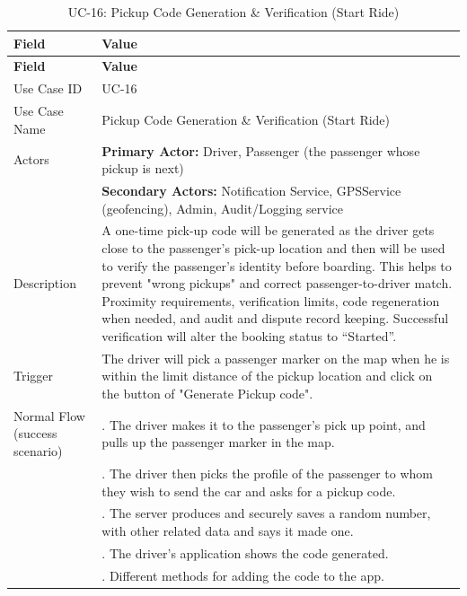 \begin{longtable}{|>{\raggedright\arraybackslash}p{4cm}|>{\raggedright\arraybackslash}p{11cm}|}
\caption{UC-16: Pickup Code Generation \& Verification (Start Ride)}
\label{tab:uc-16} \\
\hline
\rowcolor{lightgray!30}
\textbf{Field} & \textbf{Value} \\
\hline
\endfirsthead
\hline
\rowcolor{lightgray!30}
\textbf{Field} & \textbf{Value} \\
\hline
\endhead
\hline
\endfoot
\hline
\endlastfoot
Use Case ID & UC-16 \\
\hline
Use Case Name & Pickup Code Generation \& Verification (Start Ride) \\
\hline
Actors & \textbf{Primary Actor:} Driver, Passenger (the passenger whose pickup is next) \\
& \textbf{Secondary Actors:} Notification Service, GPSService (geofencing), Admin, Audit/Logging service \\
\hline
Description & A one-time pick-up code will be generated as the driver gets close to the passenger's pick-up location and then will be used to verify the passenger's identity before boarding. This helps to prevent "wrong pickups" and correct passenger-to-driver match. Proximity requirements, verification limits, code regeneration when needed, and audit and dispute record keeping. Successful verification will alter the booking status to “Started”. \\
\hline
Trigger & The driver will pick a passenger marker on the map when he is within the limit distance of the pickup location and click on the button of "Generate Pickup code". \\
\hline
Normal Flow (success scenario) & 1. The driver makes it to the passenger's pick up point, and pulls up the passenger marker in the map. \\
& 2. The driver then picks the profile of the passenger to whom they wish to send the car and asks for a pickup code. \\
& 3. The server produces and securely saves a random number, with other related data and says it made one. \\
& 4. The driver's application shows the code generated. \\
& 5. Different methods for adding the code to the app. \\

\end{longtable}
